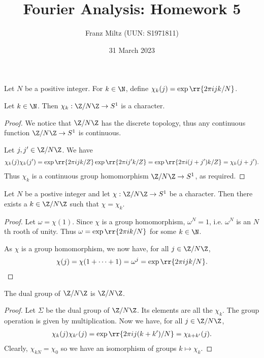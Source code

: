 \documentclass{article}
\begin{document}
\title{Fourier Analysis: Homework 5}
\author{Franz Miltz (UUN: S1971811)}
\date{31 March 2023}
\maketitle

Let $N$ be a positive integer.
For $k\in\N$, define $\chi_k(j) = \exp\rr{2\pi ijk/N}$.

\begin{claim*}[4]
  Let $k\in\N$. Then $\chi_k : \Z/N\Z \to S^1$ is a character.
  \begin{proof}
    We notice that $\Z/N\Z$ has the discrete topology, thus any
    continuous function $\Z/N\Z\to S^1$ is continuous.

    Let $j,j'\in\Z/N\Z$. We have
    \begin{align*}
      \chi_k(j)\chi_k(j')
      = \exp\rr{2\pi ijk/Z}\exp\rr{2\pi ij'k/Z}
      = \exp\rr{2\pi i(j+j')k/Z}
      = \chi_k(j+j').
    \end{align*}
    Thus $\chi_k$ is a continuous group homomorphism
    $\Z/N\Z \to S^1$, as required.
  \end{proof}
\end{claim*}

\begin{claim*}[4']
  Let $N$ be a postive integer and let $\chi: \Z/N\Z \to S^1$ be
  a character. Then there exists a $k\in\Z/N\Z$ such that
  $\chi = \chi_k$.
  \begin{proof}
    Let $\omega=\chi(1)$. Since $\chi$ is a group homomorphism,
    $\omega^N = 1$, i.e. $\omega^N$ is an $N$th rooth of unity.
    Thus $\omega = \exp\rr{2\pi i k/N}$ for some $k\in\N$.

    As $\chi$ is a group homomorphism, we now have, for all $j\in\Z/N\Z$,
    \begin{align*}
      \chi(j) = \chi(1 +\cdots + 1) = \omega^j = \exp\rr{2\pi ijk/N}.
    \end{align*}
  \end{proof}
\end{claim*}

\begin{claim*}[4'']
  The dual group of $\Z/N\Z$ is $\Z/N\Z$.
  \begin{proof}
    Let $\Sigma$ be the dual group of $\Z/N\Z$. Its elements are all the $\chi_k$.
    The group operation is given by multiplication. Now we have, for all
    $j\in\Z/N\Z$,
    \begin{align*}
      \chi_k(j) \chi_{k'}(j) = \exp\rr{2\pi ij(k+k')/N} = \chi_{k+k'}(j).
    \end{align*}
    Clearly, $\chi_{kN}=\chi_0$ so we have an isomorphism of groups
    $k \mapsto \chi_k$.
  \end{proof}
\end{claim*}
\end{document}
